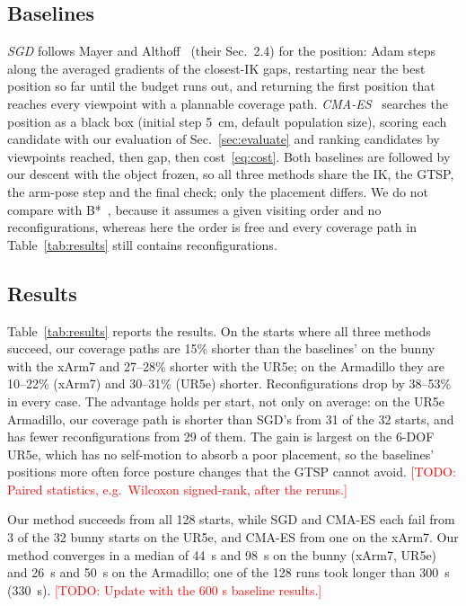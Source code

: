 \documentclass[letterpaper, journal, twoside]{IEEEtran}
\DeclareRobustCommand{\todo}[1]{\textcolor{red}{[TODO: #1]}}  %
\begin{document}
\subsection{Baselines}
\emph{SGD} follows Mayer and Althoff~\cite{mayer2026smart} (their Sec.~2.4) for the position: Adam steps along the averaged gradients of the closest-IK gaps, restarting near the best position so far until the budget runs out, and returning the first position that reaches every viewpoint with a plannable coverage path. \emph{CMA-ES}~\cite{hansen2016cmaes} searches the position as a black box (initial step 5~cm, default population size), scoring each candidate with our evaluation of Sec.~\ref{sec:evaluate} and ranking candidates by viewpoints reached, then gap, then cost~\eqref{eq:cost}. Both baselines are followed by our descent with the object frozen, so all three methods share the IK, the GTSP, the arm-pose step and the final check; only the placement differs. We do not compare with B*~\cite{bstar2025}, because it assumes a given visiting order and no reconfigurations, whereas here the order is free and every coverage path in Table~\ref{tab:results} still contains reconfigurations.

\subsection{Results}


Table~\ref{tab:results} reports the results. On the starts where all three methods succeed, our coverage paths are 15\% shorter than the baselines' on the bunny with the xArm7 and 27--28\% shorter with the UR5e; on the Armadillo they are 10--22\% (xArm7) and 30--31\% (UR5e) shorter. Reconfigurations drop by 38--53\% in every case. The advantage holds per start, not only on average: on the UR5e Armadillo, our coverage path is shorter than SGD's from 31 of the 32 starts, and has fewer reconfigurations from 29 of them. The gain is largest on the 6-DOF UR5e, which has no self-motion to absorb a poor placement, so the baselines' positions more often force posture changes that the GTSP cannot avoid. \todo{Paired statistics, e.g.\ Wilcoxon signed-rank, after the reruns.}

Our method succeeds from all 128 starts, while SGD and CMA-ES each fail from 3 of the 32 bunny starts on the UR5e, and CMA-ES from one on the xArm7. Our method converges in a median of 44~s and 98~s on the bunny (xArm7, UR5e) and 26~s and 50~s on the Armadillo; one of the 128 runs took longer than 300~s (330~s). \todo{Update with the 600 s baseline results.}
\end{document}

